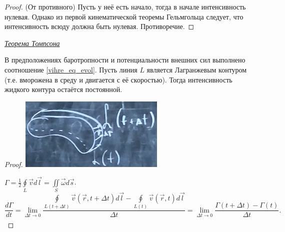 \begin{proof}
(От противного) Пусть у неё есть начало, тогда в начале интенсивность нулевая. Однако из первой кинематической теоремы Гельмгольца следует, что интенсивность всюду должна быть нулевая. Противоречие.
\end{proof}
\begin{center}
	\textit{\underline{Теорема Томпсона}}
\end{center}
\begin{theorem}
В предположениях баротропности и потенциальности внешних сил выполнено соотношение \ref{vihre_eq_evol}.
Пусть линия $L$ является Лагранжевым контуром (т.е. вморожена в среду и двигается с её скоростью).
Тогда интенсивность жидкого контура остаётся постоянной.
\end{theorem}
\begin{proof}
\begin{minipage}{0.35\linewidth}
    \centering
    \includegraphics[width=\linewidth]{13/Tompson.png}
\end{minipage}
$\Gamma = \frac{1}{2}  \oint  \limits_{L}\vec{v}d\vec{l} = \iint\limits_{S}\vec{\omega}d\vec{s}$.\\
$$\frac{d\Gamma}{dt} =
\lim\limits_{\Delta t \xrightarrow[]{} 0} \frac{
\oint  \limits_{L(t + \Delta t)}\vec{v}(\vec{r}, t + \Delta t)d\vec{l}
-
\oint  \limits_{L(t)}\vec{v}(\vec{r}, t)d\vec{l}
}{\Delta t}
=
\lim\limits_{\Delta t \xrightarrow[]{} 0} \frac{\Gamma(t+\Delta t) - \Gamma(t)}{\Delta t}.
$$


\end{proof}
